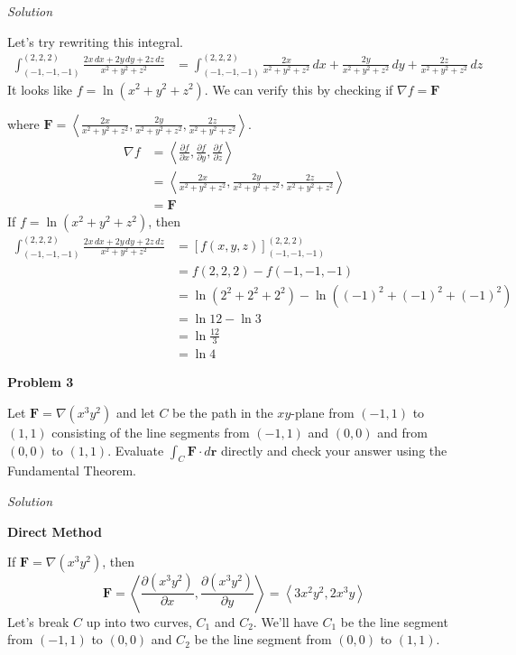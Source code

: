 \documentclass{article}
\newcommand{\lrp}[1]{\left( #1 \right)}
\newcommand{\lra}[1]{\left\langle #1 \right\rangle}
\newcommand{\lrb}[1]{\left[ #1 \right]}
\renewcommand{\r}[0]{\mathbf{r}}
\newcommand{\F}[0]{\mathbf{F}}
\newcommand{\Solution}{\textit{Solution}}
\begin{document}
\Solution

Let's try rewriting this integral.
\begin{align*}
    \int_{(-1,-1,-1)}^{(2,2,2)}\frac{2x\,dx+2y\,dy+2z\,dz}{x^2+y^2+z^2} &=\int_{(-1,-1,-1)}^{(2,2,2)} \frac{2x}{x^2+y^2+z^2}\,dx+\frac{2y}{x^2+y^2+z^2}\,dy+\frac{2z}{x^2+y^2+z^2}\,dz
\end{align*}
It looks like $\displaystyle f=\ln\lrp{x^2+y^2+z^2}$. We can verify this by checking if $\nabla f=\F$ 

where $\displaystyle \F=\lra{\frac{2x}{x^2+y^2+z^2},\frac{2y}{x^2+y^2+z^2},\frac{2z}{x^2+y^2+z^2}}$.
\begin{align*}
    \nabla f &=\lra{\frac{\partial f}{\partial x}, \frac{\partial f}{\partial y}, \frac{\partial f}{\partial z}}\\
    &=\lra{\frac{2x}{x^2+y^2+z^2},\frac{2y}{x^2+y^2+z^2},\frac{2z}{x^2+y^2+z^2}}\\
    &=\F
\end{align*}
If $\displaystyle f=\ln\lrp{x^2+y^2+z^2}$, then
\begin{align*}
    \int_{(-1,-1,-1)}^{(2,2,2)}\frac{2x\,dx+2y\,dy+2z\,dz}{x^2+y^2+z^2}&=\lrb{f(x,y,z)}_{(-1,-1,-1)}^{(2,2,2)}\\
    &=f(2,2,2)-f(-1,-1,-1)\\
    &=\ln \lrp{2^2 + 2^2 + 2^2}-\ln \lrp{(-1)^2 + (-1)^2 +(-1)^2}\\
    &=\ln 12 - \ln 3\\
    &=\ln \frac{12}{3}\tag{property of $\ln$}\\
    &=\boxed{\ln 4}
\end{align*}
{}\textbf{Problem 3}

Let $\F=\nabla(x^3y^2)$ and let $C$ be the path in the $xy$-plane from $(-1,1)$ to $(1,1)$ consisting of the line segments from $(-1,1)$ and $(0,0)$ and from $(0,0)$ to $(1,1)$. Evaluate $\int_C \F\cdot d\r$ directly and check your answer using the Fundamental Theorem.

\Solution

{}\textbf{Direct Method}

If $\F=\nabla(x^3y^2)$, then
\begin{equation*}
    \F =\lra{\frac{\partial (x^3y^2)}{\partial x}, \frac{\partial (x^3y^2)}{\partial y}}=\lra{3x^2y^2, 2x^3y}
\end{equation*}
Let's break $C$ up into two curves, $C_1$ and $C_2$. We'll have $C_1$ be the line segment from $(-1,1)$ to $(0,0)$ and $C_2$ be the line segment from $(0,0)$ to $(1,1)$.
\end{document}
